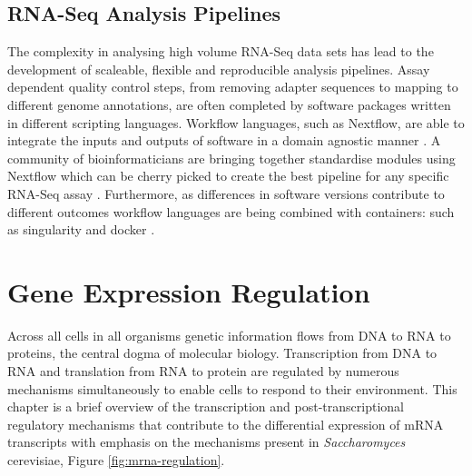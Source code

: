 \documentclass[../main.tex]{subfiles}
\begin{document}
\subsection{RNA-Seq Analysis Pipelines}

The complexity in analysing high volume RNA-Seq data sets has lead to the development of scaleable, flexible and reproducible analysis pipelines.
Assay dependent quality control steps, from removing adapter sequences to mapping to different genome annotations, are often completed by software packages written in different scripting languages.
Workflow languages, such as Nextflow, are able to integrate the inputs and outputs of software in a domain agnostic manner \parencite{DiTommaso2017}.
A community of bioinformaticians are bringing together standardise modules using Nextflow which can be cherry picked to create the best pipeline for any specific RNA-Seq assay \parencite{Ewels2020}.
Furthermore, as differences in software versions contribute to different outcomes workflow languages are being combined with containers: such as singularity and docker \parencite{DiTommaso2015}.

\newpage

\section{Gene Expression Regulation}

Across all cells in all organisms genetic information flows from DNA to RNA to proteins, the central dogma of molecular biology.
Transcription from DNA to RNA and translation from RNA to protein are regulated by numerous mechanisms simultaneously to enable cells to respond to their environment.
This chapter is a brief overview of the transcription and post-transcriptional regulatory mechanisms that contribute to the differential expression of mRNA transcripts with emphasis on the mechanisms present in \textit{Saccharomyces} cerevisiae, Figure \ref{fig:mrna-regulation}. 
\end{document}
